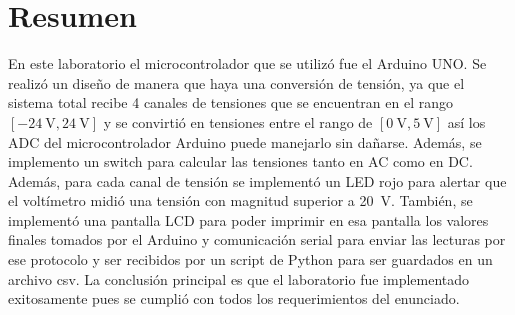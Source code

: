 \section{Resumen}

En este laboratorio el microcontrolador que se utilizó fue el Arduino UNO. Se realizó un diseño de manera que haya una conversión de tensión, ya que el sistema total recibe 4 canales de tensiones que se encuentran en el rango $[\SI{-24}{\volt}, \SI{24}{\volt}]$ y se convirtió en tensiones entre el rango de $[\SI{0}{\volt}, \SI{5}{\volt}]$ así los ADC del microcontrolador Arduino puede manejarlo sin dañarse. Además, se implemento un switch para calcular las tensiones tanto en AC como en DC. Además, para cada canal de tensión se implementó un LED rojo para alertar que el voltímetro midió una tensión con magnitud superior a \SI{20}{\volt}. También, se implementó una pantalla LCD para poder imprimir en esa pantalla los valores finales tomados por el Arduino y comunicación serial para enviar las lecturas por ese protocolo y ser recibidos por un script de Python para ser guardados en un archivo csv. La conclusión principal es que el laboratorio fue implementado exitosamente pues se cumplió con todos los requerimientos del enunciado.




